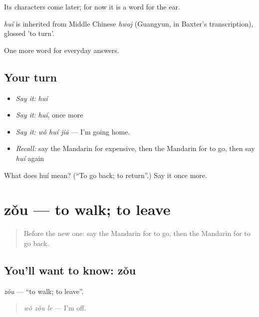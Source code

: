 Its characters come later; for now it is a word for the ear.

\begin{cousinweb}
\emph{huí} is inherited from Middle Chinese \emph{hwoj} (Guangyun, in Baxter's transcription), glossed 'to turn'.
\end{cousinweb}

\begin{grammarlens}[title={What you've built}]
One more word for everyday answers.
\end{grammarlens}

\subsection*{Your turn}
\begin{itemize}
\raggedright
  \item \emph{Say it:} \emph{huí}
  \item \emph{Say it:} \emph{huí}, once more
  \item \emph{Say it:} \emph{wǒ huí jiā} — I'm going home.
  \item \emph{Recall:} say the Mandarin for expensive, then the Mandarin for to go, then say \emph{huí} again
\end{itemize}

\begin{tcolorbox}[breakable,colback=teal!4,colframe=teal!35!black,title={Before you move on}]
What does huí mean? (\textquotedblleft{}To go back; to return\textquotedblright{}.) Say it once more.
\end{tcolorbox}
\section[zǒu]{zǒu — to walk; to leave}

\label{lesson:ZH-C43-zou}



\begin{quote}
Before the new one: say the Mandarin for to go, then the Mandarin for to go back.
\end{quote}

\subsection*{You'll want to know: zǒu}
\emph{zǒu} — \textquotedblleft{}to walk; to leave\textquotedblright{}.

\begin{quote}
\emph{wǒ zǒu le} — I'm off.
\end{quote}

